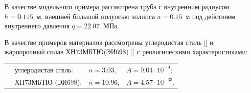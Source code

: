 
В качестве модельного примера рассмотрена труба с внутренним радиусом $h=0.115$~м, внешней большой полуосью эллипса $a=0.15$~м под действием внутреннего давления $q=22.07$~МПа.

В качестве примеров материалов рассмотрены углеродистая сталь []  и жаропрочный сплав ХН73МБТЮ(ЭИ698) [] с реологическими характеристиками:



\begin{tabular}{llll}

\hspace{1cm}

&углеродистая сталь: & $n=3.03$, & $A=9.04\cdot10^{-9}$; \\

&ХН73МБТЮ (ЭИ698): & $n=10.96$, & $A=4.57\cdot10^{-33}$. \\

\end{tabular}



\smallskip





